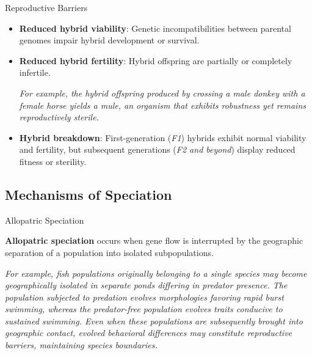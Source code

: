 \documentclass[10pt]{article}
\begin{document}
\begin{core}{Reproductive Barriers}
\begin{enumerate}
\begin{itemize}
          \item \textbf{Reduced hybrid viability}: Genetic incompatibilities between parental genomes impair hybrid development or survival.

          \item \textbf{Reduced hybrid fertility}: Hybrid offspring are partially or completely infertile.


          \textit{For example, the hybrid offspring produced by crossing a male donkey with a female horse yields a mule, an organism that exhibits robustness yet remains reproductively sterile.}

          \item \textbf{Hybrid breakdown}: First-generation (\textit{F1}) hybrids exhibit normal viability and fertility, but subsequent generations (\textit{F2 and beyond}) display reduced fitness or sterility.

        \end{itemize}

      \end{enumerate}

    \end{core}

  \subsection{Mechanisms of Speciation}

    \begin{core}{Allopatric Speciation}

      \textbf{Allopatric speciation} occurs when gene flow is interrupted by the geographic separation of a population into isolated subpopulations. 


      \textit{For example, fish populations originally belonging to a single species may become geographically isolated in separate ponds differing in predator presence. The population subjected to predation evolves morphologies favoring rapid burst swimming, whereas the predator-free population evolves traits conducive to sustained swimming. Even when these populations are subsequently brought into geographic contact, evolved behavioral differences may constitute reproductive barriers, maintaining species boundaries.}

    \end{core}
\end{document}
